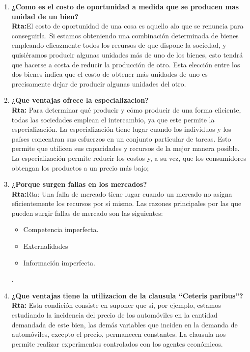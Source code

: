 \documentclass[12pt]{book}
\begin{document}
\begin{enumerate}
\item \textbf{¿Como es el costo de oportunidad a medida que se producen mas unidad de un bien?}
\\
\textbf{Rta:}El costo de oportunidad de una cosa es aquello alo que se renuncia para
conseguirla.
Si estamos obteniendo una combinación determinada de bienes empleando eficazmente todos los recursos de que dispone la sociedad, y quisiéramos producir algunas unidades más de uno de los bienes, esto tendrá que hacerse a costa de reducir la producción de otro. Esta elección entre los dos bienes indica que el costo de obtener más unidades de uno es precisamente dejar de producir algunas unidades del otro.



\item \textbf{¿Que ventajas ofrece la especializacion?}
\\
\textbf{Rta:} Para determinar qué producir y cómo producir de una forma eficiente, todas las sociedades emplean el intercambio, ya que este permite la especialización.
La especialización tiene lugar cuando los individuos y los países concentran sus esfuerzos en un conjunto particular de tareas. Esto permite que utilicen sus capacidades y recursos de la mejor manera posible.
La especialización permite reducir los costos y, a su vez, que los consumidores obtengan los productos a un precio más bajo;


\item \textbf{¿Porque surgen fallas en los mercados?}
\\
\textbf{Rta:}Rta: Una falla de mercado tiene lugar cuando un mercado no asigna eficientemente los recursos por sí mismo.
Las razones principales por las que pueden surgir fallas de mercado son las siguientes:
\begin{itemize}
\item Competencia imperfecta.
\item Externalidades
\item Información imperfecta.

\end{itemize}
.

\item \textbf{¿Que ventajas tiene la utilizacion de la clausula “Ceteris paribus”?}
\\
\textbf{Rta:} Esta condición consiste en suponer que si, por ejemplo, estamos estudiando la
incidencia del precio de los automóviles en la cantidad demandada de este bien, las demás variables que inciden en la demanda de automóviles, excepto el precio,
permanecen constantes.
La clausula nos permite  realizar experimentos controlados con los agentes económicos.



\end{enumerate}
\end{document}
